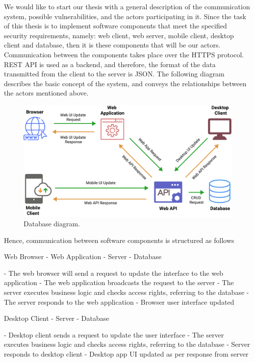 We would like to start our thesis with a general description of the communication system, possible vulnerabilities, and the actors participating in it.
Since the task of this thesis is to implement software components that meet the specified security requirements,
namely: web client, web server, mobile client, desktop client and database, then it is these components that will be our
actors.
Communication between the components takes place over the HTTPS protocol.
REST API is used as a backend, and therefore, the format of the data transmitted from the client to the server is JSON\@.
The following diagram describes the basic concept of the system, and conveys the relationships between the actors mentioned above.

\begin{figure}[H]
    \centering
    \includegraphics[width=1\textwidth]{Pictures/Threat_Modeling}
    \caption{Database diagram.}\label{fig:figure6}
\end{figure}

Hence, communication between software components is structured as follows

Web Browser - Web Application - Server - Database

- The web browser will send a request to update the interface to the web application
- The web application broadcasts the request to the server
- The server executes business logic and checks access rights, referring to the database
- The server responds to the web application
- Browser user interface updated

Desktop Client - Server - Database

- Desktop client sends a request to update the user interface
- The server executes business logic and checks access rights, referring to the database
- Server responds to desktop client
- Desktop app UI updated as per response from server

